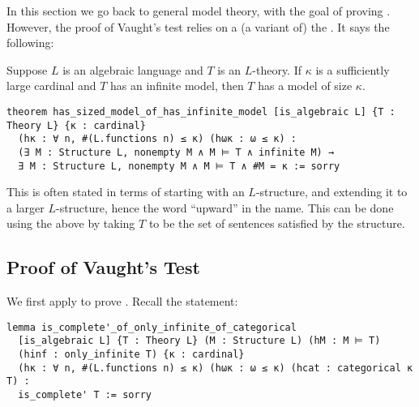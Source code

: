 In this section we go back to general model theory,
with the goal of proving .
However, the proof of Vaught's test relies on a (a variant of) the
.
It says the following:

\begin{prop}
  Suppose $L$ is an algebraic language and $T$ is an $L$-theory.
  If $\kappa$ is a sufficiently large cardinal and $T$ has an infinite model,
  then $T$ has a model of size $\kappa$.

  \begin{lstlisting}
theorem has_sized_model_of_has_infinite_model [is_algebraic L] {T : Theory L} {κ : cardinal}
  (hκ : ∀ n, #(L.functions n) ≤ κ) (hωκ : ω ≤ κ) :
  (∃ M : Structure L, nonempty M ∧ M ⊨ T ∧ infinite M) →
  ∃ M : Structure L, nonempty M ∧ M ⊨ T ∧ #M = κ := sorry \end{lstlisting}
\end{prop}

This is often stated in terms of starting with an $L$-structure,
and extending it to a larger $L$-structure,
hence the word ``upward'' in the name.
This can be done using the above by taking $T$ to be the set of
sentences satisfied by the structure.

\subsection{Proof of Vaught's Test}

We first apply  to prove .
Recall the statement:

\begin{lstlisting}
lemma is_complete'_of_only_infinite_of_categorical
  [is_algebraic L] {T : Theory L} (M : Structure L) (hM : M ⊨ T)
  (hinf : only_infinite T) {κ : cardinal}
  (hκ : ∀ n, #(L.functions n) ≤ κ) (hωκ : ω ≤ κ) (hcat : categorical κ T) :
  is_complete' T := sorry \end{lstlisting}

